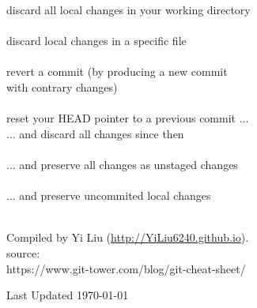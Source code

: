 \documentclass[12pt,landscape]{article}
\begin{document}
\begin{multicols*}{3}
discard all local changes in your working directory \\
 \\

discard local changes in a specific file \\
 \\

revert a commit (by producing a new commit \\
with contrary changes) \\
 \\

reset your HEAD pointer to a previous commit ...\\

\textcolor{solarized_green}{... and discard all changes since then} \\
 \\

\textcolor{solarized_green}{... and preserve all changes as unstaged changes} \\
 \\

\textcolor{solarized_green}{... and preserve uncommited local changes} \\
 \\


\scriptsize
\textcolor{solarized_base01}{
  Compiled by Yi Liu (\url{http://YiLiu6240.github.io}). \\
  source: \\
  https://www.git-tower.com/blog/git-cheat-sheet/ \\
  \begin{center}
    Last Updated \today
  \end{center}
}
\end{multicols*}
\end{document}
